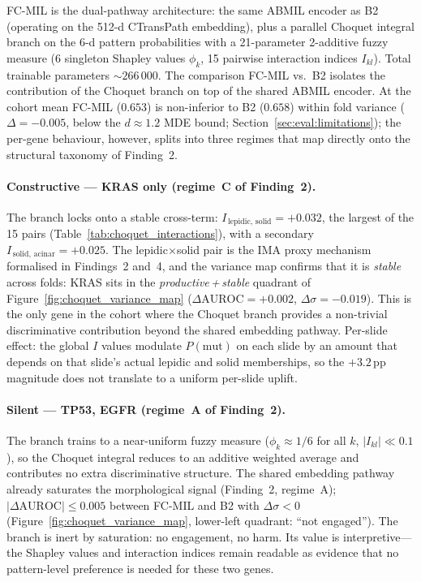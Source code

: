 FC-MIL is the dual-pathway architecture: the same ABMIL encoder as
B2 (operating on the 512-d CTransPath embedding), plus a parallel
Choquet integral branch on the 6-d pattern probabilities with a
21-parameter 2-additive fuzzy measure (6 singleton Shapley values
$\phi_k$, 15 pairwise interaction indices $I_{kl}$).
Total trainable parameters $\sim 266\,000$.
The comparison FC-MIL vs.\ B2 isolates the contribution of the
Choquet branch on top of the shared ABMIL encoder.
At the cohort mean FC-MIL ($0.653$) is non-inferior to B2 ($0.658$)
within fold variance ($\Delta = -0.005$, below the $d \approx 1.2$
MDE bound; Section~\ref{sec:eval:limitations}); the per-gene
behaviour, however, splits into three regimes that map directly
onto the structural taxonomy of Finding~2.

\paragraph{Constructive --- KRAS only (regime~C of Finding~2).}
The branch locks onto a stable cross-term:
$I_{\,\mathrm{lepidic,\,solid}} = +0.032$, the largest of the 15
pairs (Table~\ref{tab:choquet_interactions}), with a secondary
$I_{\,\mathrm{solid,\,acinar}} = +0.025$.
The lepidic$\times$solid pair is the IMA proxy mechanism formalised
in Findings~2 and~4, and the variance map confirms that it is
\emph{stable} across folds: KRAS sits in the
\emph{productive\,+\,stable} quadrant of
Figure~\ref{fig:choquet_variance_map}
($\Delta\mathrm{AUROC} = +0.002$, $\Delta\sigma = -0.019$).
This is the only gene in the cohort where the Choquet branch
provides a non-trivial discriminative contribution beyond the
shared embedding pathway.
Per-slide effect: the global $I$ values modulate
$P(\mathrm{mut})$ on each slide by an amount that depends on that
slide's actual lepidic and solid memberships, so the
$+3.2$\,pp magnitude does not translate to a uniform per-slide
uplift.

\paragraph{Silent --- TP53, EGFR (regime~A of Finding~2).}
The branch trains to a near-uniform fuzzy measure
($\phi_k \approx 1/6$ for all $k$, $|I_{kl}| \ll 0.1$), so the
Choquet integral reduces to an additive weighted average and
contributes no extra discriminative structure.
The shared embedding pathway already saturates the morphological
signal (Finding~2, regime~A); $|\Delta\mathrm{AUROC}| \leq 0.005$
between FC-MIL and B2 with $\Delta\sigma < 0$
(Figure~\ref{fig:choquet_variance_map}, lower-left quadrant: ``not
engaged'').
The branch is inert by saturation: no engagement, no harm.
Its value is interpretive---the Shapley values and interaction
indices remain readable as evidence that no pattern-level
preference is needed for these two genes.

